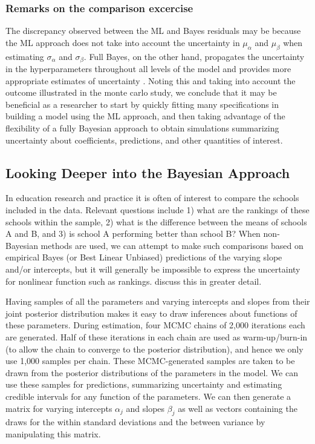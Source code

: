 \subsubsection*{Remarks on the comparison excercise}
The discrepancy observed between the ML and Bayes residuals may be because the ML approach does not take into account the uncertainty in $\mu_{\alpha}$ and $\mu_{\beta}$ when estimating $\sigma_{\alpha}$ and $\sigma_{\beta}$. Full Bayes, on the other hand, propagates the uncertainty in the hyperparameters throughout all levels of the model and provides more appropriate estimates of uncertainty \cite{browne2006comparison}. Noting this and taking into account the outcome illustrated in the monte carlo study, we conclude that it may be beneficial as a researcher to start by quickly fitting many specifications in building a model using the ML approach, and then taking advantage of the flexibility of a fully Bayesian approach to obtain simulations summarizing uncertainty about coefficients, predictions, and other quantities of interest.

\subsection{Looking Deeper into the Bayesian Approach}
\label{subsection:Deeper}
In education research and practice it is often of interest to compare the schools included in the data. Relevant questions include 1) what are the rankings of these schools within the sample, 2) what is the difference between the means of schools A and B, and 3) is school A performing better than school B? When non-Bayesian methods are used, we can attempt to make such comparisons based on empirical Bayes (or Best Linear Unbiased) predictions of the varying slope and/or intercepts, but it will generally be impossible to express the uncertainty for nonlinear function such as rankings. \cite{goldstein1996league} discuss this in greater detail.

Having samples of all the parameters and varying intercepts and slopes from their joint posterior distribution makes it easy to draw inferences about functions of these parameters.
During estimation, four MCMC chains of 2,000 iterations each are generated. Half of these iterations in each chain are used as warm-up/burn-in (to allow the chain to converge to the posterior distribution), and hence we only use 1,000 samples per chain. These MCMC-generated samples are taken to be drawn from the posterior distributions of the parameters in the model. We can use these samples for predictions, summarizing uncertainty and estimating credible intervals for any function of the parameters.
We can then generate a matrix for varying intercepts $\alpha_j$ and slopes $\beta_j$ as well as vectors containing the draws for the within standard deviations and the between variance by manipulating this matrix.

